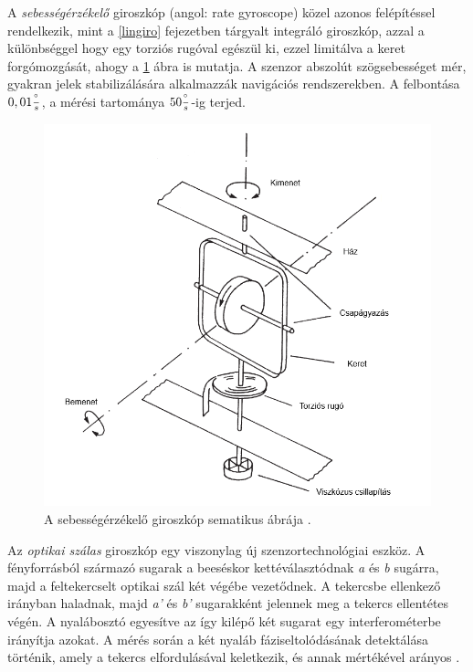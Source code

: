 A \textit{sebességérzékelő} giroszkóp (angol: rate gyroscope) közel azonos felépítéssel rendelkezik, mint a \ref{lingiro} fejezetben tárgyalt integráló giroszkóp, azzal a különbséggel hogy egy torziós rugóval egészül ki, ezzel limitálva a keret forgómozgását, ahogy a \ref{rategyro} ábra is mutatja. A szenzor abszolút szögsebességet mér, gyakran jelek stabilizálására alkalmazzák navigációs rendszerekben. A felbontása $0,01\frac{\degree}{s}$, a mérési tartománya $50\frac{\degree}{s}$-ig terjed.
\begin{figure}
	\centering
	\includegraphics[width=\columnwidth*5/10]{figures/rategyro.png}
	\caption{A sebességérzékelő giroszkóp sematikus ábrája \cite{Morris2016b}.}
	\label{rategyro}
\end{figure}
Az \textit{optikai szálas} giroszkóp egy viszonylag új szenzortechnológiai eszköz. A fényforrásból származó sugarak a beeséskor kettéválasztódnak \textit{a} és \textit{b} sugárra, majd a feltekercselt optikai szál két végébe vezetődnek. A tekercsbe ellenkező irányban haladnak, majd \textit{a'} és \textit{b'} sugarakként jelennek meg a tekercs ellentétes végén. A nyalábosztó egyesítve az így kilépő két sugarat egy interferométerbe irányítja azokat. A mérés során a két nyaláb fáziseltolódásának detektálása történik, amely a tekercs elfordulásával keletkezik, és annak mértékével arányos \cite{Morris2016b}.

